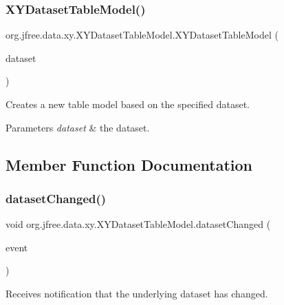 \subsubsection{\texorpdfstring{X\+Y\+Dataset\+Table\+Model()}{XYDatasetTableModel()}\hspace{0.1cm}{\footnotesize\ttfamily [2/2]}}
{\footnotesize\ttfamily org.\+jfree.\+data.\+xy.\+X\+Y\+Dataset\+Table\+Model.\+X\+Y\+Dataset\+Table\+Model (\begin{DoxyParamCaption}\item[{\mbox{\hyperlink{interfaceorg_1_1jfree_1_1data_1_1xy_1_1_table_x_y_dataset}{Table\+X\+Y\+Dataset}}}]{dataset }\end{DoxyParamCaption})}

Creates a new table model based on the specified dataset.


\begin{DoxyParams}{Parameters}
{\em dataset} & the dataset. \\
\hline
\end{DoxyParams}


\subsection{Member Function Documentation}
\mbox{\label{classorg_1_1jfree_1_1data_1_1xy_1_1_x_y_dataset_table_model_a27492e15f01464d63a9a5983e1460ebb}} 
\subsubsection{\texorpdfstring{dataset\+Changed()}{datasetChanged()}}
{\footnotesize\ttfamily void org.\+jfree.\+data.\+xy.\+X\+Y\+Dataset\+Table\+Model.\+dataset\+Changed (\begin{DoxyParamCaption}\item[{\mbox{\hyperlink{classorg_1_1jfree_1_1data_1_1general_1_1_dataset_change_event}{Dataset\+Change\+Event}}}]{event }\end{DoxyParamCaption})}

Receives notification that the underlying dataset has changed.


